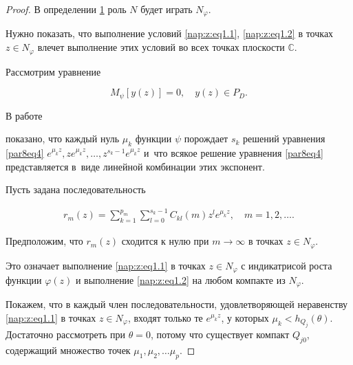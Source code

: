\begin{proof}


В определении \hyperlink{nap:z:d1}{1} роль $N$ будет играть $N_{\varphi}$. 

Нужно показать, что выполнение условий \eqref{nap:z:eq1.1}, \eqref{nap:z:eq1.2} в точках $z\in N_{\varphi}$ влечет выполнение этих условий во всех точках плоскости $\mathbb C $. 

%



%

Рассмотрим уравнение 

\begin{equation}

\label{par8eq4}

M_{\psi}[y(z)]=0,\quad  y(z)\in P_D. 

\end{equation}

В работе \cite{zabirova4} %

показано, что каждый нуль $\mu_k$ функции $\psi$ порождает $s_k$ решений уравнения \eqref{par8eq4} $e^{\mu_kz}, ze^{\mu_kz}, \dots, z^{s_k-1}e^{\mu_kz}$ и~что всякое решение уравнения \eqref{par8eq4} представляется в~виде линейной комбинации этих экспонент.



Пусть задана последовательность 

\begin{eqnarray} \label{nap:z:eq3.2}

r_m(z)=\sum\limits^{p_m}_{k=1}\sum\limits^{s_k-1}_{l=0}{C_{kl}(m)z^{l}e^{\mu_kz}}, \quad m=1, 2, \dots .

\end{eqnarray}

Предположим, что $r_m(z)$ сходится к нулю при $m\to\infty$ в точках $z\in N_{\varphi}$. 

Это означает выполнение \eqref{nap:z:eq1.1} в точках $z\in N_{\varphi}$ с индикатрисой роста функции $\varphi(z)$ и выполнение \eqref{nap:z:eq1.2} на любом компакте из $N_{\varphi}$.



Покажем, что в каждый член последовательности, удовлетворяющей неравенству \eqref{nap:z:eq1.1} в точках $z\in N_{\varphi}$, входят только те $e^{\mu_kz}$, у которых $\mu_k< h_{Q_j}(\theta)$. Достаточно рассмотреть при $\theta=0$, потому что существует компакт $Q_{j0}$, содержащий множество точек $\mu_1,\mu_2,\dots \mu_p$.




\end{proof}
